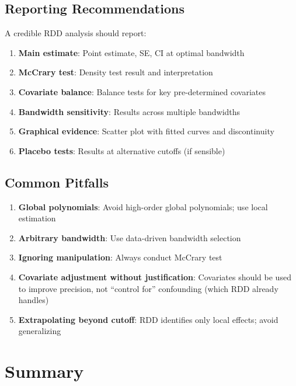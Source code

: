 \subsection{Reporting Recommendations}

A credible RDD analysis should report:
\begin{enumerate}
    \item \textbf{Main estimate}: Point estimate, SE, CI at optimal bandwidth
    \item \textbf{McCrary test}: Density test result and interpretation
    \item \textbf{Covariate balance}: Balance tests for key pre-determined covariates
    \item \textbf{Bandwidth sensitivity}: Results across multiple bandwidths
    \item \textbf{Graphical evidence}: Scatter plot with fitted curves and discontinuity
    \item \textbf{Placebo tests}: Results at alternative cutoffs (if sensible)
\end{enumerate}

\subsection{Common Pitfalls}

\begin{enumerate}
    \item \textbf{Global polynomials}: Avoid high-order global polynomials; use local estimation
    \item \textbf{Arbitrary bandwidth}: Use data-driven bandwidth selection
    \item \textbf{Ignoring manipulation}: Always conduct McCrary test
    \item \textbf{Covariate adjustment without justification}: Covariates should be used to improve precision, not ``control for'' confounding (which RDD already handles)
    \item \textbf{Extrapolating beyond cutoff}: RDD identifies only local effects; avoid generalizing
\end{enumerate}

\section{Summary}
\label{sec:rdd_summary}

